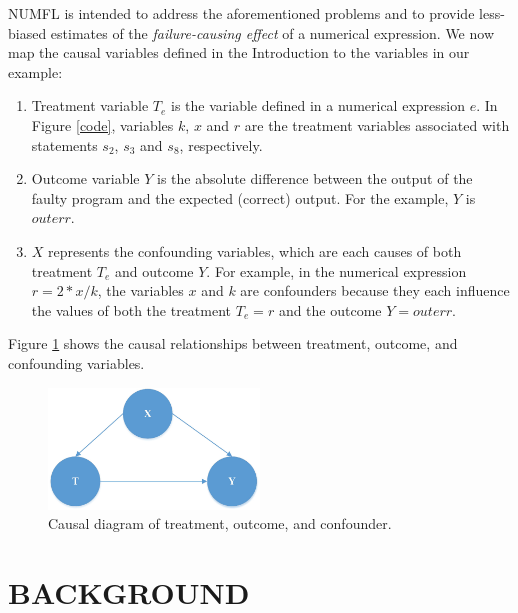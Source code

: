 \documentclass[times]{stvrauth}
\begin{document}
NUMFL is intended to address the aforementioned problems and to provide less-biased estimates of the {\it failure-causing effect} of a numerical expression.  We now map the causal variables defined in the Introduction to the variables in our example:
\begin{enumerate}
\item 	Treatment variable $T_e$ is the variable defined in a numerical expression $e$.  In Figure \ref{code}, variables $k$, $x$ and $r$ are the treatment variables associated with statements $s_2$, $s_3$ and $s_8$, respectively.
	\item Outcome variable $Y$ is the absolute difference between the output of the faulty program and the expected (correct) output.  For the example, $Y$ is $outerr$.
\item $X$ represents the confounding variables, which are each causes of both treatment $T_e$ and outcome $Y$. For example, in the numerical expression $r=2*x/k$, the variables $x$ and $k$ are confounders because they each influence the values of both the treatment $T_e=r$ and the outcome $Y=outerr$.

\end{enumerate}

Figure \ref{dag1} shows the causal relationships between treatment, outcome, and confounding variables.
\begin{figure}[!thpb]
\centering
\includegraphics[width=0.5\textwidth]{CausalDAG1.eps}
\caption{Causal diagram of treatment, outcome, and confounder.}
\label{dag1}
\end{figure}

\section{BACKGROUND}\label{background}
\end{document}
